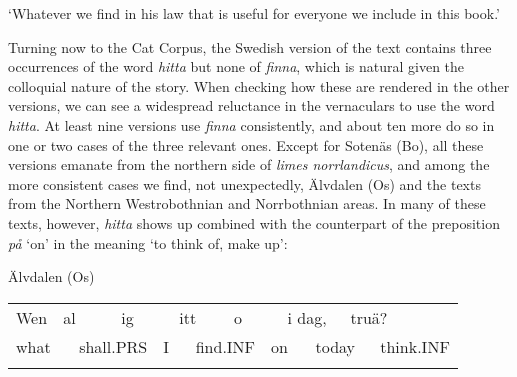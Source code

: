 \begin{styleTranslation}
‘Whatever we find in his law that is useful for everyone we include in this book.’

\end{styleTranslation}

\begin{styleBodyTextFirst}
Turning now to the Cat Corpus, the Swedish version of the text contains three occurrences of the word \textit{hitta} but none of \textit{finna}, which is natural given the colloquial nature of the story. When checking how these are rendered in the other versions, we can see a widespread reluctance in the vernaculars to use the word \textit{hitta}. At least nine versions use \textit{finna} consistently, and about ten more do so in one or two cases of the three relevant ones. Except for Sotenäs (Bo), all these versions emanate from the northern side of \textit{limes norrlandicus}, and among the more consistent cases we find, not unexpectedly, Älvdalen (Os) and the texts from the Northern Westrobothnian and Norrbothnian areas. In many of these texts, however, \textit{hitta} shows up combined with the counterpart of the preposition \textit{på} ‘on’ in the meaning ‘to think of, make up’:

\end{styleBodyTextFirst}

\begin{listWWNumileveli}
\item {}

\begin{styleExample}
Älvdalen (Os)

\end{styleExample}

\end{listWWNumileveli}

\begin{tabular}{llllllllllllll}
\lsptoprule
Wen & \multicolumn{2}{l}{al

} & \multicolumn{2}{l}{ig

} & \multicolumn{2}{l}{itt

} & \multicolumn{2}{l}{o

} & \multicolumn{2}{l}{i dag,

} & \multicolumn{2}{l}{truä?

} & \\
\multicolumn{2}{l}{what

} & \multicolumn{2}{l}{shall.PRS

} & \multicolumn{2}{l}{I

} & \multicolumn{2}{l}{find.INF

} & \multicolumn{2}{l}{on

} & \multicolumn{2}{l}{today

} & \multicolumn{2}{l}{think.INF

}\\
\lspbottomrule
\end{tabular}

